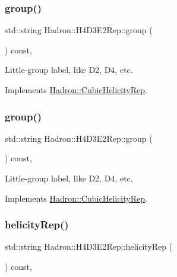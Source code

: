\subsubsection{\texorpdfstring{group()}{group()}\hspace{0.1cm}{\footnotesize\ttfamily [2/3]}}
{\footnotesize\ttfamily std\+::string Hadron\+::\+H4\+D3\+E2\+Rep\+::group (\begin{DoxyParamCaption}{ }\end{DoxyParamCaption}) const\hspace{0.3cm}{\ttfamily [inline]}, {\ttfamily [virtual]}}

Little-\/group label, like D2, D4, etc. 

Implements \mbox{\hyperlink{structHadron_1_1CubicHelicityRep_a101a7d76cd8ccdad0f272db44b766113}{Hadron\+::\+Cubic\+Helicity\+Rep}}.

\mbox{\label{structHadron_1_1H4D3E2Rep_a362911306406bcb51e8c6865513d5c44}} 
\subsubsection{\texorpdfstring{group()}{group()}\hspace{0.1cm}{\footnotesize\ttfamily [3/3]}}
{\footnotesize\ttfamily std\+::string Hadron\+::\+H4\+D3\+E2\+Rep\+::group (\begin{DoxyParamCaption}{ }\end{DoxyParamCaption}) const\hspace{0.3cm}{\ttfamily [inline]}, {\ttfamily [virtual]}}

Little-\/group label, like D2, D4, etc. 

Implements \mbox{\hyperlink{structHadron_1_1CubicHelicityRep_a101a7d76cd8ccdad0f272db44b766113}{Hadron\+::\+Cubic\+Helicity\+Rep}}.

\mbox{\label{structHadron_1_1H4D3E2Rep_a79e0c262ae365b9efabe080707d034a8}} 
\subsubsection{\texorpdfstring{helicityRep()}{helicityRep()}\hspace{0.1cm}{\footnotesize\ttfamily [1/2]}}
{\footnotesize\ttfamily std\+::string Hadron\+::\+H4\+D3\+E2\+Rep\+::helicity\+Rep (\begin{DoxyParamCaption}{ }\end{DoxyParamCaption}) const\hspace{0.3cm}{\ttfamily [inline]}, {\ttfamily [virtual]}}


